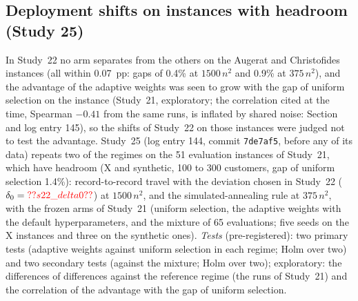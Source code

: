 \subsection{Deployment shifts on instances with headroom (Study 25)}\label{sec:s25design}
In Study~22 no arm separates from the others on the Augerat and Christofides instances (all within 0.07~pp: gaps of 0.4\% at $1500\,n^2$ and 0.9\% at $375\,n^2$), and the advantage of the adaptive weights was seen to grow with the gap of uniform selection on the instance (Study~21, exploratory; the correlation cited at the time, Spearman $-0.41$ from the same runs, is inflated by shared noise: Section~ and log entry 145), so the shifts of Study~22 on those instances were judged not to test the advantage. Study~25 (log entry 144, commit \texttt{7de7af5}, before any of its data) repeats two of the regimes on the 51 evaluation instances of Study~21, which have headroom (X and synthetic, 100 to 300 customers, gap of uniform selection 1.4\%): record-to-record travel with the deviation chosen in Study~22 ($\delta_0=\num{s22_delta0}$) at $1500\,n^2$, and the simulated-annealing rule at $375\,n^2$, with the frozen arms of Study~21 (uniform selection, the adaptive weights with the default hyperparameters, and the mixture of 65 evaluations; five seeds on the X instances and three on the synthetic ones). \emph{Tests} (pre-registered): two primary tests (adaptive weights against uniform selection in each regime; Holm over two) and two secondary tests (against the mixture; Holm over two); exploratory: the differences of differences against the reference regime (the runs of Study~21) and the correlation of the advantage with the gap of uniform selection.



